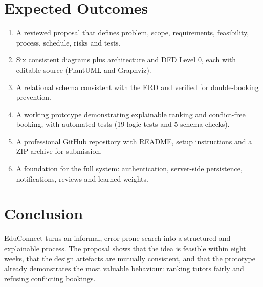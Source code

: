 \documentclass[11pt,a4paper]{article}
\begin{document}
\section{Expected Outcomes}
\begin{enumerate}
  \item A reviewed proposal that defines problem, scope, requirements, feasibility, process, schedule, risks and tests.
  \item Six consistent diagrams plus architecture and DFD Level 0, each with editable source (PlantUML and Graphviz).
  \item A relational schema consistent with the ERD and verified for double-booking prevention.
  \item A working prototype demonstrating explainable ranking and conflict-free booking, with automated tests (19 logic tests and 5 schema checks).
  \item A professional GitHub repository with README, setup instructions and a ZIP archive for submission.
  \item A foundation for the full system: authentication, server-side persistence, notifications, reviews and learned weights.
\end{enumerate}

\section{Conclusion}
EduConnect turns an informal, error-prone search into a structured and explainable process. The proposal shows that the idea is feasible within eight weeks, that the design artefacts are mutually consistent, and that the prototype already demonstrates the most valuable behaviour: ranking tutors fairly and refusing conflicting bookings.

\clearpage



\appendix
\end{document}
